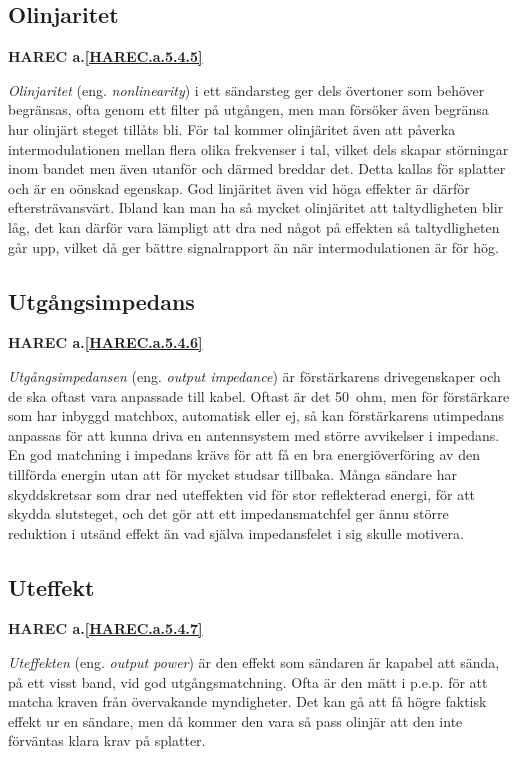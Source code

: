 \subsection{Olinjaritet}
\textbf{HAREC
  a.\ref{HAREC.a.5.4.5}\label{myHAREC.a.5.4.5}
}

\emph{Olinjaritet} (eng. \emph{nonlinearity}) i ett sändarsteg ger dels
övertoner som behöver begränsas, ofta genom ett filter på utgången, men man
försöker även begränsa hur olinjärt steget tillåts bli.
För tal kommer olinjäritet även att påverka intermodulationen mellan flera
olika frekvenser i tal, vilket dels skapar störningar inom bandet men även
utanför och därmed breddar det.
Detta kallas för splatter och är en oönskad egenskap.
God linjäritet även vid höga effekter är därför eftersträvansvärt.
Ibland kan man ha så mycket olinjäritet att taltydligheten blir låg, det
kan därför vara lämpligt att dra ned något på effekten så taltydligheten går
upp, vilket då ger bättre signalrapport än när intermodulationen är för hög.

\subsection{Utgångsimpedans}
\textbf{HAREC
  a.\ref{HAREC.a.5.4.6}\label{myHAREC.a.5.4.6}
}

\emph{Utgångsimpedansen} (eng. \emph{output impedance}) är förstärkarens
drivegenskaper och de ska oftast vara anpassade till kabel.
Oftast är det 50~ohm, men för förstärkare som har inbyggd matchbox,
automatisk eller ej, så kan förstärkarens utimpedans anpassas
för att kunna driva en antennsystem med större avvikelser i impedans.
En god matchning i impedans krävs för att få en bra energiöverföring av den
tillförda energin utan att för mycket studsar tillbaka.
Många sändare har skyddskretsar som drar ned uteffekten vid för stor
reflekterad energi, för att skydda slutsteget, och det gör att ett
impedansmatchfel ger ännu större reduktion i utsänd effekt än vad själva
impedansfelet i sig skulle motivera.

\subsection{Uteffekt}
\textbf{HAREC
  a.\ref{HAREC.a.5.4.7}\label{myHAREC.a.5.4.7}
}

\emph{Uteffekten} (eng. \emph{output power}) är den effekt som sändaren är
kapabel att sända, på ett visst band, vid god utgångsmatchning.
Ofta är den mätt i p.e.p. för att matcha kraven från övervakande myndigheter.
Det kan gå att få högre faktisk effekt ur en sändare, men då kommer den vara
så pass olinjär att den inte förväntas klara krav på splatter.

